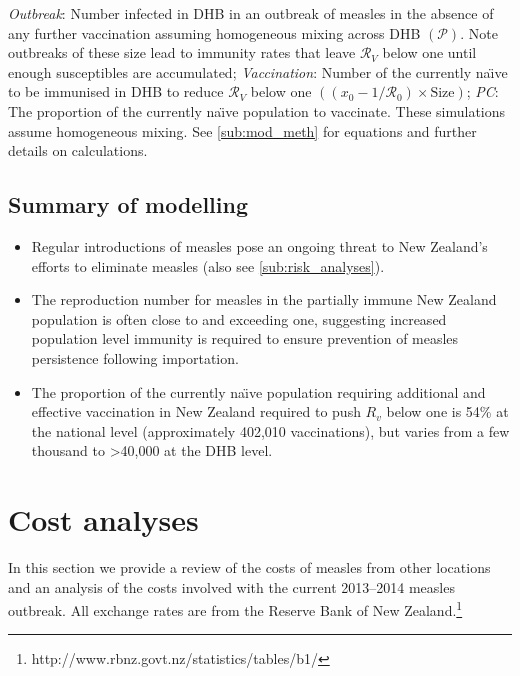 \documentclass{article}
\newcommand{\Pe}{\mathcal{P}}
\newcommand{\Ro}{\mathcal{R}_0}
\newcommand{\Rr}{\mathcal{R}}
\begin{document}
\begin{table}
{\textit{Outbreak}: Number infected in DHB in an outbreak of measles in the absence of any further vaccination assuming homogeneous mixing across DHB $\left(\Pe\right)$. Note outbreaks of these size lead to immunity rates that leave $\Rr_V$ below one until enough susceptibles are accumulated;	
\textit{Vaccination}:	Number of the currently na\"{\i}ve to be immunised in DHB to reduce $\Rr_V$ below one  $\left(\left(x_0-1/\Ro\right)\times\text{Size}\right)$; \textit{PC}: The proportion of the currently na\"{\i}ve population to vaccinate. These simulations assume homogeneous mixing. See \autoref{sub:mod_meth} for equations and further details on calculations.
}
\label{table:attack}
\end{table}

\subsection{Summary of modelling}
\begin{itemize}
\item Regular introductions of measles pose an ongoing threat to New Zealand's efforts to eliminate measles (also see \autoref{sub:risk_analyses}).
\item The reproduction number for measles in the partially immune New Zealand population is often close to and exceeding one, suggesting increased population level immunity is required to ensure prevention of measles persistence following importation.
 \item The proportion of the currently na\"{\i}ve population requiring additional and effective vaccination in New Zealand required to push $R_v$ below one is 54\% at the national level (approximately 402,010 vaccinations), but varies from a few thousand to >40,000 at the DHB level.
\end{itemize}

\section{Cost analyses}
\label{sec:cb}

In this section we provide a review of the costs of measles from other locations and an analysis of the costs involved with the current 2013--2014 measles outbreak. All exchange rates are from the Reserve Bank of New Zealand.\footnote{http://www.rbnz.govt.nz/statistics/tables/b1/}
\end{document}
